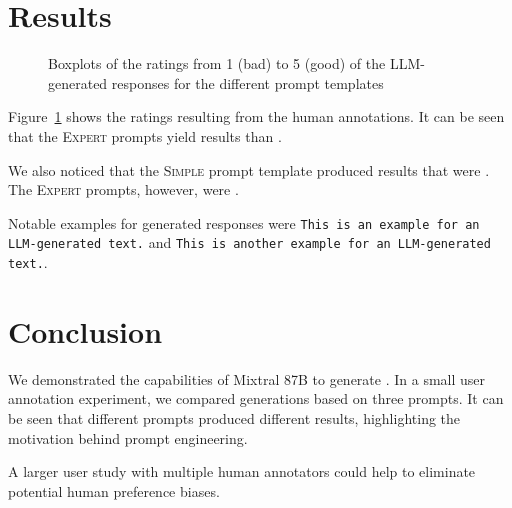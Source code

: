 \documentclass[11pt]{article}
\begin{document}
\section{Results}
\begin{figure}\centering
  
  \caption{Boxplots of the ratings from 1 (bad) to 5 (good) of the LLM-generated responses for the different prompt templates}
  \label{fig:boxplots}
\end{figure}


Figure~\ref{fig:boxplots} shows the ratings resulting from the human annotations.
It can be seen that the \textsc{Expert} prompts yield  results than .

We also noticed that the \textsc{Simple} prompt template produced results that were . The \textsc{Expert} prompts, however, were .

Notable examples for generated responses were \texttt{This is an example for an LLM-generated text.} and  \texttt{This is another example for an LLM-generated text.}\todo{}.


\section{Conclusion}

We demonstrated the capabilities of Mixtral 8\texttimes 7B to generate . In a small user annotation experiment, we compared generations based on three prompts.
It can be seen that different prompts produced different results, highlighting the motivation behind prompt engineering.

A larger user study with multiple human annotators could help to eliminate potential human preference biases.


\end{document}
